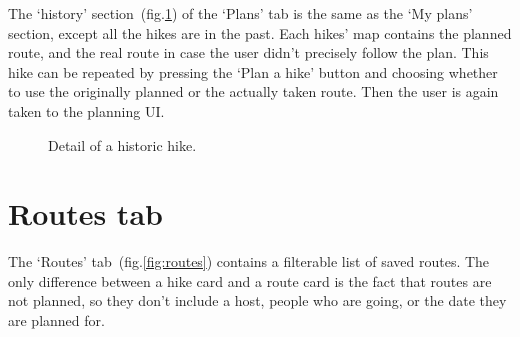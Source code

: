The `history' section~(fig.\ref{fig:plan-history}) of the `Plans' tab is the same as the `My plans' section, except all the hikes are in the past.
Each hikes' map contains the planned route, and the real route in case the user didn't precisely follow the plan.
This hike can be repeated by pressing the `Plan a hike' button and choosing whether to use the originally planned or the actually taken route.
Then the user is again taken to the planning UI.

\begin{figure}[h!]
    \centering
    \hfill
    \caption{Detail of a historic hike.}
    \label{fig:plan-history}
\end{figure}

\section{Routes tab}
The `Routes' tab~(fig.\ref{fig:routes}) contains a filterable list of saved routes.
The only difference between a hike card and a route card is the fact that routes are not planned, so they don't include a host, people who are going, or the date they are planned for.

